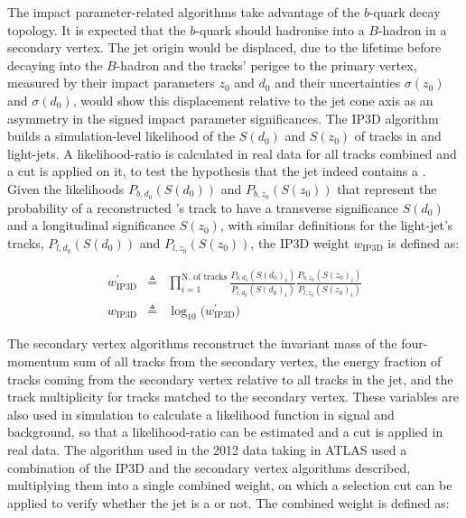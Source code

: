 The impact parameter-related algorithms take advantage of the $b$-quark decay topology.
It is expected that the $b$-quark should hadronise into a $B$-hadron in a secondary vertex.
The jet origin would be displaced, due to the \bjet lifetime before decaying into the $B$-hadron and the tracks' perigee to the primary vertex, measured by their
impact parameters $z_0$ and $d_0$ and their uncertainties $\sigma(z_0)$ and $\sigma(d_0)$, would show this displacement relative to the jet cone axis
as an asymmetry in the signed impact parameter
significances. The IP3D algorithm builds a simulation-level likelihood of the $S(d_0)$ and $S(z_0)$ of tracks in \bjets and light-jets. A likelihood-ratio
is calculated in real data for all tracks combined and a cut is applied on it, to test the hypothesis that the jet indeed contains a \bjet.
Given the likelihoods $P_{b,d_0}(S(d_0))$ and $P_{b, z_0}(S(z_0))$ that represent the probability of a reconstructed \bjet's
track to have a transverse significance $S(d_0)$ and
a longitudinal significance $S(z_0)$, with similar definitions for the light-jet's tracks, $P_{l, d_0}(S(d_0))$ and $P_{l, z_0}(S(z_0))$, the IP3D weight $w_{\textrm{IP3D}}$
is defined as:

\begin{eqnarray}
\displaystyle
w^\prime_{\textrm{IP3D}} &\triangleq& \prod_{i=1}^{\textrm{N. of tracks}} \frac{P_{b,d_0}(S(d_0)_i)}{P_{l, d_0}(S(d_0)_i)} \frac{P_{b,z_0}(S(z_0)_i)}{P_{l, z_0}(S(z_0)_i)} \\
w_{\textrm{IP3D}} &\triangleq &\log_{10} \Big( w^\prime_{\textrm{IP3D}} \Big)
\label{eq:ip3d}
\end{eqnarray}

The secondary vertex algorithms reconstruct the invariant mass of the four-momentum sum of all tracks from the secondary vertex, the energy fraction of tracks coming from
the secondary vertex relative to all tracks in the jet, and the track multiplicity for tracks matched to the secondary vertex. These variables are also used in simulation
to calculate a likelihood function in signal and background, so that a likelihood-ratio can be estimated and a cut is applied in real data.
The algorithm used in the 2012 data taking in ATLAS used a combination of the IP3D and the secondary vertex algorithms described,
multiplying them into a single combined weight, on which a selection cut can be applied to verify whether the jet is a \bjet or not.
The combined weight is defined as:

